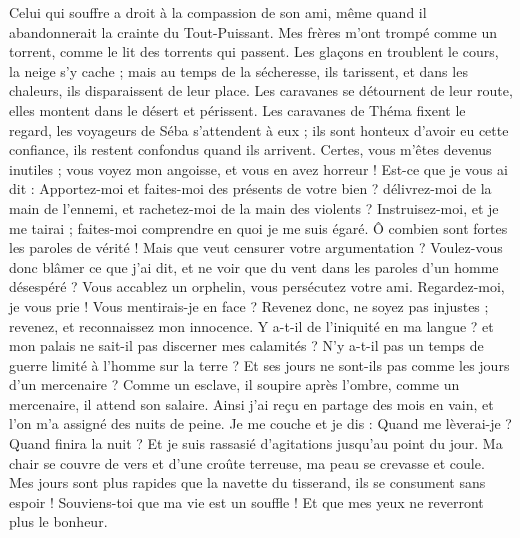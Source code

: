 \begin{multicols}{2}
Celui qui souffre a droit à la compassion de son ami, même quand il abandonnerait la crainte du Tout-Puissant.
Mes frères m'ont trompé comme un torrent, comme le lit des torrents qui passent.
Les glaçons en troublent le cours, la neige s'y cache ;
mais au temps de la sécheresse, ils tarissent, et dans les chaleurs, ils disparaissent de leur place.
Les caravanes se détournent de leur route, elles montent dans le désert et périssent.
Les caravanes de Théma fixent le regard, les voyageurs de Séba s'attendent à eux ;
ils sont honteux d'avoir eu cette confiance, ils restent confondus quand ils arrivent.
Certes, vous m'êtes devenus inutiles ; vous voyez mon angoisse, et vous en avez horreur !
Est-ce que je vous ai dit : Apportez-moi et faites-moi des présents de votre bien ? 
délivrez-moi de la main de l'ennemi, et rachetez-moi de la main des violents ?
Instruisez-moi, et je me tairai ; faites-moi comprendre en quoi je me suis égaré.
Ô combien sont fortes les paroles de vérité ! Mais que veut censurer votre argumentation ?
Voulez-vous donc blâmer ce que j'ai dit, et ne voir que du vent dans les paroles d'un homme désespéré ?
Vous accablez un orphelin, vous persécutez votre ami.
Regardez-moi, je vous prie ! Vous mentirais-je en face ?
Revenez donc, ne soyez pas injustes ; revenez, et reconnaissez mon innocence.
Y a-t-il de l'iniquité en ma langue ? et mon palais ne sait-il pas discerner mes calamités ? 
\VerseOne{}N'y a-t-il pas un temps de guerre limité à l'homme sur la terre ? Et ses jours ne sont-ils pas comme les jours d'un mercenaire ?
Comme un esclave, il soupire après l'ombre, comme un mercenaire, il attend son salaire.
Ainsi j'ai reçu en partage des mois en vain, et l'on m'a assigné des nuits de peine.
Je me couche et je dis : Quand me lèverai-je ? Quand finira la nuit ? Et je suis rassasié d'agitations jusqu'au point du jour.
Ma chair se couvre de vers et d'une croûte terreuse, ma peau se crevasse et coule.
Mes jours sont plus rapides que la navette du tisserand, ils se consument sans espoir !
Souviens-toi que ma vie est un souffle ! Et que mes yeux ne reverront plus le bonheur.

\end{multicols}
